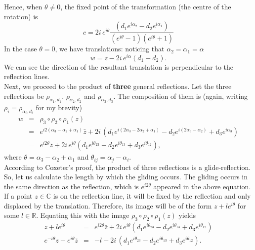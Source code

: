 \documentclass{article}
\begin{document}
Hence, when $\theta \ne 0$, the fixed point of the transformation (the centre of the rotation) is
\begin{equation}
c =  2i \, e^{i\theta}\frac{( d_{1} e^{i\alpha_{2}} - d_{2} e^{i\alpha_{1}}) }{(e^{i\theta} - 1)(e^{i\theta} + 1)} \nonumber 
\end{equation}
In the case $\theta = 0$, we have translations: noticing that $\alpha_{2} = \alpha_{1} = \alpha$ 
\begin{equation}
w = z - 2i \, e^{i\alpha} ( d_{1}  - d_{2}).
\end{equation}
We can see the direction of the resultant translation is perpendicular to the reflection lines.\\

Next, we proceed to the product of \textbf{three} general reflections. Let the three reflections be $\rho_{\alpha_{1}, d_{1}}$, $\rho_{\alpha_{2},d_{2}}$ and $\rho_{\alpha_{3},d_{3}}$.
The composition of them is (again, writing $\rho_{i} = \rho_{\alpha_{i}, d_{i}}$ for my brevity)
\begin{eqnarray}
w &=& \rho_{3} \circ \rho_{2} \circ \rho_{1} (z) \nonumber \\
  &=& e^{i2(\alpha_{3} - \alpha_{2} + \alpha_{1})} \bar{z} + 2i \, ( d_{1} e^{i(2\alpha_{3} - 2\alpha_{2} + \alpha_{1})} - d_{2} e^{i(2\alpha_{3} - \alpha_{2})} + d_{3} e^{i\alpha_{3}})  \nonumber \\
  &=& e^{i2\theta} \bar{z} + 2i \, e^{i\theta}( d_{1} e^{i\theta_{23}} - d_{2} e^{i\theta_{13}} + d_{3} e^{i\theta_{12}}),
\end{eqnarray}
where $\theta = \alpha_{3} - \alpha_{2} + \alpha_{1}$ and $\theta_{ij} = \alpha_{j} - \alpha_{i}$.\\
According to Coxeter's proof, the product of three reflections is a glide-reflection. So, let us calculate the length by which the gliding occurs.
The gliding occurs in the same direction as the reflection, which is $e^{i2\theta}$ appeared in the above equation.
If a point $z \in \mathbb{C}$ is on the reflection line, it will be fixed by the reflection and only displaced by the translation. 
Therefore, its image will be of the form $z + l e^{i\theta}$ for some $l \in \mathbb{R}$.
Equating this with the image $\rho_{3} \circ \rho_{2} \circ \rho_{1} (z)$ yields
\begin{eqnarray}
\label{eq:gliding-length}
z + l e^{i\theta}  &=& e^{i2\theta} \bar{z} + 2i \, e^{i\theta}( d_{1} e^{i\theta_{23}} - d_{2} e^{i\theta_{13}} + d_{3} e^{i\theta_{12}}) \nonumber \\
e^{-i\theta} z - e^{i\theta} \bar{z}  &=& -l + 2i\,( d_{1} e^{i\theta_{23}} - d_{2} e^{i\theta_{13}} + d_{3} e^{i\theta_{12}}). 
\end{eqnarray}
\end{document}
